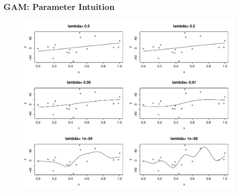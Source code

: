 \documentclass{beamer}
\begin{document}
\begin{frame}
\frametitle{GAM: Parameter Intuition}
\begin{figure}

\includegraphics[scale=.35]{figures/splineDiffLambda}
\end{figure}
\end{frame}
\end{document}
